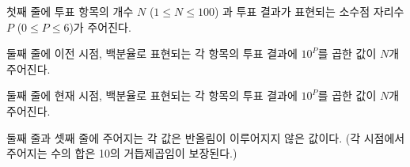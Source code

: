 첫째 줄에 투표 항목의 개수 $N$ ($1\leq N\leq100$) 과 투표 결과가 표현되는 소수점 자리수 $P$ ($0\leq P\leq6$)가 주어진다.

둘째 줄에 이전 시점, 백분율로 표현되는 각 항목의 투표 결과에 $10^P$를 곱한 값이 $N$개 주어진다.

둘째 줄에 현재 시점, 백분율로 표현되는 각 항목의 투표 결과에 $10^P$를 곱한 값이 $N$개 주어진다.

둘째 줄과 셋째 줄에 주어지는 각 값은 반올림이 이루어지지 않은 값이다. (각 시점에서 주어지는 수의 합은 10의 거듭제곱임이 보장된다.)
